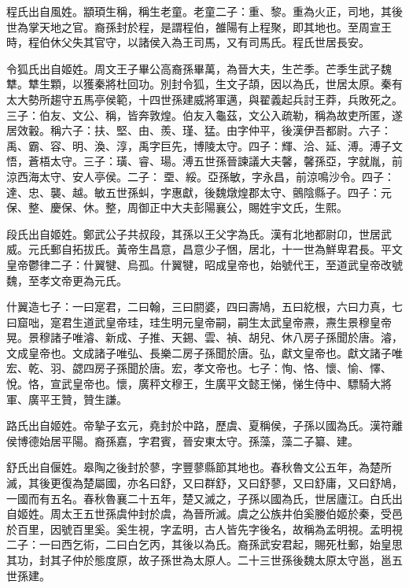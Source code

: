 \begin{pinyinscope}
 程氏出自風姓。顓頊生稱，稱生老童。老童二子：重、黎。重為火正，司地，其後世為掌天地之官。裔孫封於程，是謂程伯，雒陽有上程聚，即其地也。至周宣王時，程伯休父失其官守，以諸侯入為王司馬，又有司馬氏。程氏世居長安。



 令狐氏出自姬姓。周文王子畢公高裔孫畢萬，為晉大夫，生芒季。芒季生武子魏犨。犨生顆，以獲秦將杜回功。別封令狐，生文子頡，因以為氏，世居太原。秦有太大勢所趨守五馬亭侯範，十四世孫建威將軍邁，與翟義起兵討王莽，兵敗死之。三子：伯友、文公、稱，皆奔敦煌。伯友入龜茲，文公入疏勒，稱為故吏所匿，遂居效轂。稱六子：扶、堅、由、羨、瑾、猛。由字仲平，後漢伊吾都尉。六子：禹、霸、容、明、渙、淳，禹字巨先，博陵太守。四子：輝、洽、延、溥。溥子文悟，蒼梧太守。三子：璜、睿、瑒。溥五世孫晉諫議大夫馨，馨孫亞，字就胤，前涼西海太守、安人亭侯。二子：垔、綏。亞孫敏，字永昌，前涼鳴沙令。四子：達、忠、襲、越。敏五世孫虯，字惠獻，後魏燉煌郡太守、鸇陰縣子。四子：元保、整、慶保、休。整，周御正中大夫彭陽襄公，賜姓宇文氏，生熙。



 段氏出自姬姓。鄭武公子共叔段，其孫以王父字為氏。漢有北地都尉卬，世居武威。元氏郵自拓拔氏。黃帝生昌意，昌意少子悃，居北，十一世為鮮卑君長。平文皇帝鬱律二子：什翼犍、烏孤。什翼犍，昭成皇帝也，始號代王，至道武皇帝改號魏，至孝文帝更為元氏。



 什翼造七子：一曰寔君，二曰翰，三曰閼婆，四曰壽鳩，五曰紇根，六曰力真，七曰窟咄，寔君生道武皇帝珪，珪生明元皇帝嗣，嗣生太武皇帝燾，燾生景穆皇帝晃。景穆諸子唯濬、新成、子推、天錫、雲、禎、胡兒、休八房子孫聞於唐。濬，文成皇帝也。文成諸子唯弘、長樂二房子孫聞於唐。弘，獻文皇帝也。獻文諸子唯宏、乾、羽、勰四房子孫聞於唐。宏，孝文帝也。七子：恂、恪、懷、愉、懌、悅。恪，宣武皇帝也。懷，廣秤文穆王，生廣平文懿王悌，悌生侍中、驃騎大將軍、廣平王贊，贊生謙。



 路氏出自姬姓。帝摯子玄元，堯封於中路，歷虞、夏稱侯，子孫以國為氏。漢符離侯博德始居平陽。裔孫嘉，字君賓，晉安東太守。孫藻，藻二子纂、建。



 舒氏出自偃姓。皋陶之後封於蓼，字豐蓼縣節其地也。春秋魯文公五年，為楚所滅，其後更復為楚屬國，亦名曰舒，又曰群舒，又曰舒蓼，又曰舒庸，又曰舒鳩，一國而有五名。春秋魯襄二十五年，楚又滅之，子孫以國為氏，世居廬江。白氏出自姬姓。周太王五世孫虞仲封於虞，為晉所滅。虞之公族井伯奚媵伯姬於秦，受邑於百里，因號百里奚。奚生視，字孟明，古人皆先字後名，故稱為孟明視。孟明視二子：一曰西乞術，二曰白乞丙，其後以為氏。裔孫武安君起，賜死杜郵，始皇思其功，封其子仲於態度原，故子孫世為太原人。二十三世孫後魏太原太守邕，邕五世孫建。




\end{pinyinscope}
